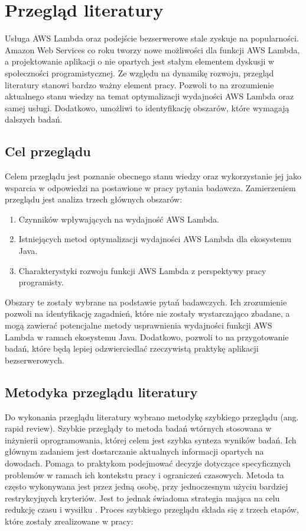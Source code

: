 \chapter{Przegląd literatury}\label{chapter:przeglad_literatury}

Usługa AWS Lambda oraz podejście bezserwerowe stale zyskuje na popularności.
Amazon Web Services co roku tworzy nowe możliwości dla funkcji AWS Lambda, a projektowanie aplikacji o nie opartych jest stałym elementem dyskusji w społeczności programistycznej.
Ze względu na dynamikę rozwoju, przegląd literatury stanowi bardzo ważny element pracy. 
Pozwoli to na zrozumienie aktualnego stanu wiedzy na temat optymalizacji wydajności AWS Lambda oraz samej usługi.
Dodatkowo, umożliwi to identyfikację obszarów, które wymagają dalszych badań.

\section{Cel przeglądu}\label{chapter:cel_przegladu}

Celem przeglądu jest poznanie obecnego stanu wiedzy oraz wykorzystanie jej jako wsparcia w odpowiedzi na postawione w pracy pytania badawcza. 
Zamierzeniem przeglądu jest analiza trzech głównych obszarów:

\begin{enumerate}
    \item Czynników wpływających na wydajność AWS Lambda.
    \item Istniejących metod optymalizacji wydajności AWS Lambda dla ekosystemu Java.
    \item Charakterystyki rozwoju funkcji AWS Lambda z perspektywy pracy programisty.
\end{enumerate}

Obszary te zostały wybrane na podstawie pytań badawczych. 
Ich zrozumienie pozwoli na identyfikację zagadnień, które nie zostały wystarczająco zbadane, 
a mogą zawierać potencjalne metody usprawnienia wydajności funkcji AWS Lambda w ramach ekosystemu Java.
Dodatkowo, pozwoli to na przygotowanie badań, które będą lepiej odzwierciedlać rzeczywistą praktykę aplikacji bezserwerowych.

\section{Metodyka przeglądu literatury}\label{chapter:metodyka_przegladu}

Do wykonania przeglądu literatury wybrano metodykę szybkiego przeglądu (ang. rapid review). 
Szybkie przeglądy to metoda badań wtórnych stosowana w inżynierii oprogramowania, której celem jest szybka synteza wyników badań.
Ich głównym zadaniem jest dostarczanie aktualnych informacji opartych na dowodach.
Pomaga to praktykom podejmować decyzje dotyczące specyficznych problemów w ramach ich kontekstu pracy i ograniczeń czasowych.
Metoda ta często wykonywana jest przez jedną osobę, przy jednoczesnym użyciu bardziej restrykcyjnych kryteriów.
Jest to jednak świadoma strategia mająca na celu redukcję czasu i wysiłku \cite{cartaxo2020rapidreviewssoftwareengineering}.
Proces szybkiego przeglądu składa się z trzech etapów, które zostały zrealizowane w pracy:

